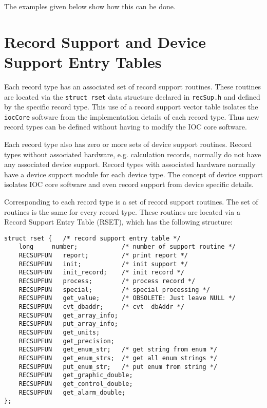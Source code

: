 The examples given below show how this can be done.

\section{Record Support and Device Support Entry Tables}

Each record type has an associated set of record support routines.
These routines are located via the \verb|struct rset| data structure declared in \verb|recSup.h| and defined by the specific record type.
This use of a record support vector table isolates the \verb|iocCore| software from the implementation details of each record type.
Thus new record types can be defined without having to modify the IOC core software.

Each record type also has zero or more sets of device support routines.
Record types without associated hardware, e.g. calculation records, normally do not have any associated device support.
Record types with associated hardware normally have a  device support module for each device type.
The concept of device support isolates IOC core software and even record support from device specific details.

Corresponding to each record type is a set of record support routines.
The set of routines is the same for every record type.
These routines are located via a Record Support Entry Table (RSET), which has the following structure:

\begin{verbatim}
struct rset {   /* record support entry table */
    long     number;            /* number of support routine */
    RECSUPFUN   report;         /* print report */
    RECSUPFUN   init;           /* init support */
    RECSUPFUN   init_record;    /* init record */
    RECSUPFUN   process;        /* process record */
    RECSUPFUN   special;        /* special processing */
    RECSUPFUN   get_value;      /* OBSOLETE: Just leave NULL */
    RECSUPFUN   cvt_dbaddr;     /* cvt  dbAddr */
    RECSUPFUN   get_array_info;
    RECSUPFUN   put_array_info;
    RECSUPFUN   get_units;
    RECSUPFUN   get_precision;
    RECSUPFUN   get_enum_str;   /* get string from enum */
    RECSUPFUN   get_enum_strs;  /* get all enum strings */
    RECSUPFUN   put_enum_str;   /* put enum from string */
    RECSUPFUN   get_graphic_double;
    RECSUPFUN   get_control_double;
    RECSUPFUN   get_alarm_double;
};
\end{verbatim}

